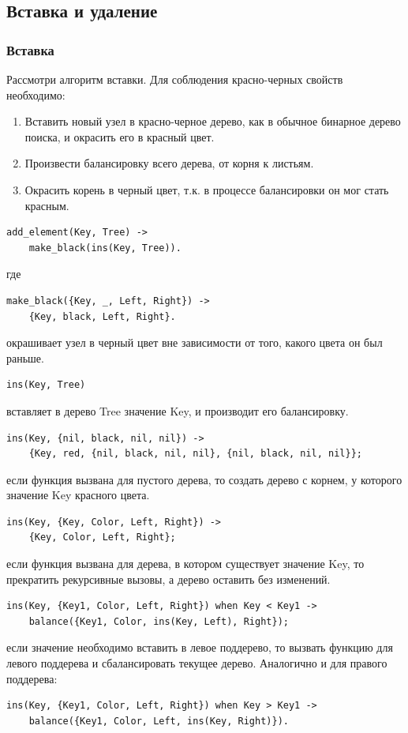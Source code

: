 	\subsection{Вставка и удаление}
		\subsubsection{Вставка}
			Рассмотри алгоритм вставки. Для соблюдения красно-черных свойств необходимо:
			\begin{enumerate}
				\item Вставить новый узел в красно-черное дерево, как в обычное бинарное 
					  дерево поиска, и окрасить его в красный цвет.
				\item Произвести балансировку всего дерева, от корня к листьям.
				\item Окрасить корень в черный цвет, т.к. в процессе балансировки он мог 
				      стать красным.
			\end{enumerate}

			\begin{lstlisting}
add_element(Key, Tree) ->
    make_black(ins(Key, Tree)).
			\end{lstlisting}
			где
			\begin{lstlisting}
make_black({Key, _, Left, Right}) ->
    {Key, black, Left, Right}.
			\end{lstlisting}
			окрашивает узел в черный цвет вне зависимости от того, какого цвета он был раньше.
	
			\begin{lstlisting}
ins(Key, Tree)
			\end{lstlisting}
			вставляет в дерево Tree значение Key, и производит его балансировку.
		
			\begin{lstlisting}
ins(Key, {nil, black, nil, nil}) ->
    {Key, red, {nil, black, nil, nil}, {nil, black, nil, nil}};
			\end{lstlisting} 
			если функция вызвана для пустого дерева, то создать дерево с корнем, у которого 
			значение Key красного цвета.
		
			\begin{lstlisting}
ins(Key, {Key, Color, Left, Right}) ->
    {Key, Color, Left, Right};
			\end{lstlisting}
			если функция вызвана для дерева, в котором существует значение Key, то 
			прекратить рекурсивные вызовы, а дерево оставить без изменений.
			
			\begin{lstlisting}
ins(Key, {Key1, Color, Left, Right}) when Key < Key1 ->
    balance({Key1, Color, ins(Key, Left), Right});
			\end{lstlisting}
			если значение необходимо вставить в левое поддерево, то вызвать функцию для 
			левого поддерева и сбалансировать текущее дерево. Аналогично и для правого 
			поддерева:
			\begin{lstlisting}
ins(Key, {Key1, Color, Left, Right}) when Key > Key1 ->
    balance({Key1, Color, Left, ins(Key, Right)}).
			\end{lstlisting}
			
